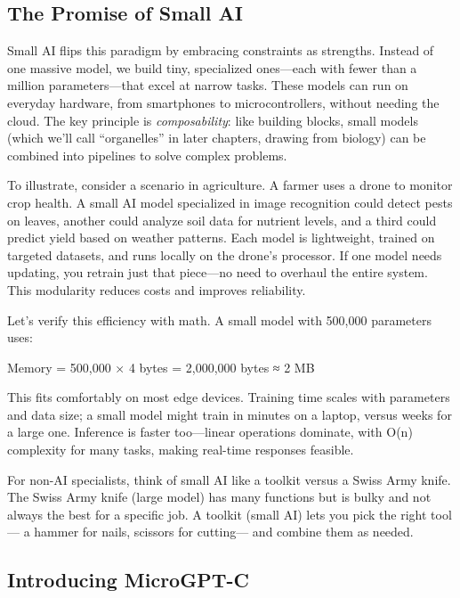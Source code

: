 \documentclass[
]{article}
\begin{document}
\subsection{The Promise of Small AI}\label{the-promise-of-small-ai}

Small AI flips this paradigm by embracing constraints as strengths.
Instead of one massive model, we build tiny, specialized ones---each
with fewer than a million parameters---that excel at narrow tasks. These
models can run on everyday hardware, from smartphones to
microcontrollers, without needing the cloud. The key principle is
\emph{composability}: like building blocks, small models (which we'll
call ``organelles'' in later chapters, drawing from biology) can be
combined into pipelines to solve complex problems.

To illustrate, consider a scenario in agriculture. A farmer uses a drone
to monitor crop health. A small AI model specialized in image
recognition could detect pests on leaves, another could analyze soil
data for nutrient levels, and a third could predict yield based on
weather patterns. Each model is lightweight, trained on targeted
datasets, and runs locally on the drone's processor. If one model needs
updating, you retrain just that piece---no need to overhaul the entire
system. This modularity reduces costs and improves reliability.

Let's verify this efficiency with math. A small model with 500,000
parameters uses:

Memory = 500,000 × 4 bytes = 2,000,000 bytes ≈ 2 MB

This fits comfortably on most edge devices. Training time scales with
parameters and data size; a small model might train in minutes on a
laptop, versus weeks for a large one. Inference is faster too---linear
operations dominate, with O(n) complexity for many tasks, making
real-time responses feasible.

For non-AI specialists, think of small AI like a toolkit versus a Swiss
Army knife. The Swiss Army knife (large model) has many functions but is
bulky and not always the best for a specific job. A toolkit (small AI)
lets you pick the right tool--- a hammer for nails, scissors for
cutting--- and combine them as needed.

\subsection{Introducing MicroGPT-C}\label{introducing-microgpt-c}
\end{document}
